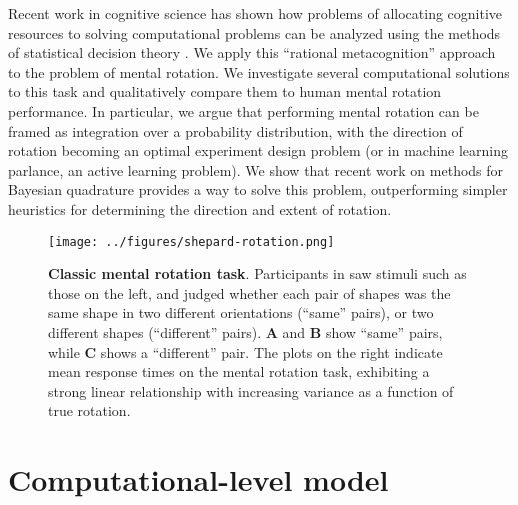 \documentclass{article} %
\begin{document}
Recent work in cognitive science has shown how problems of allocating
cognitive resources to solving computational problems can be analyzed
using the methods of statistical decision theory
\cite{Lieder:2012wg,Vul:2009wy}. We apply this ``rational
metacognition'' approach to the problem of mental rotation. We
investigate several computational solutions to this task and
qualitatively compare them to human mental rotation performance. In
particular, we argue that performing mental rotation can be framed as
integration over a probability distribution, with the direction of
rotation becoming an optimal experiment design problem (or in machine
learning parlance, an active learning problem). We show that recent
work on methods for Bayesian quadrature
\cite{Diaconis:1988uo,OHagan:1991tx,Osborne:2012tm} provides a way to
solve this problem, outperforming simpler heuristics for determining
the direction and extent of rotation.

\begin{figure}[t]
  \centering
  \texttt{[image: ../figures/shepard-rotation.png]}
  \caption{\textbf{Classic mental rotation task}. Participants in
    \cite{Shepard1971} saw stimuli such as those on the left, and
    judged whether each pair of shapes was the same shape in two
    different orientations (``same'' pairs), or two different shapes
    (``different'' pairs). \textbf{A} and \textbf{B} show ``same''
    pairs, while \textbf{C} shows a ``different'' pair. The plots on
    the right indicate mean response times on the mental rotation
    task, exhibiting a strong linear relationship with increasing
    variance as a function of true rotation.}
  \label{fig:mental-rotation}
\end{figure}

\section{Computational-level model}
\end{document}
